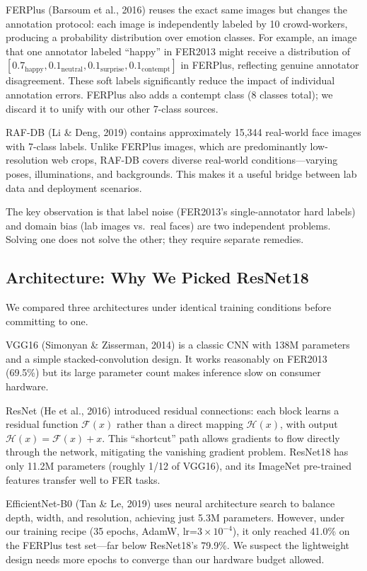 \documentclass[12pt,a4paper]{article}
\begin{document}
FERPlus (Barsoum et al., 2016) reuses the exact same images but changes the annotation protocol: each image is independently labeled by 10 crowd-workers, producing a probability distribution over emotion classes. For example, an image that one annotator labeled ``happy'' in FER2013 might receive a distribution of $[0.7_{\text{happy}}, 0.1_{\text{neutral}}, 0.1_{\text{surprise}}, 0.1_{\text{contempt}}]$ in FERPlus, reflecting genuine annotator disagreement. These soft labels significantly reduce the impact of individual annotation errors. FERPlus also adds a contempt class (8 classes total); we discard it to unify with our other 7-class sources.

RAF-DB (Li \& Deng, 2019) contains approximately 15,344 real-world face images with 7-class labels. Unlike FERPlus images, which are predominantly low-resolution web crops, RAF-DB covers diverse real-world conditions---varying poses, illuminations, and backgrounds. This makes it a useful bridge between lab data and deployment scenarios.

The key observation is that label noise (FER2013's single-annotator hard labels) and domain bias (lab images vs.\ real faces) are two independent problems. Solving one does not solve the other; they require separate remedies.

\subsection{Architecture: Why We Picked ResNet18}

We compared three architectures under identical training conditions before committing to one.

VGG16 (Simonyan \& Zisserman, 2014) is a classic CNN with 138M parameters and a simple stacked-convolution design. It works reasonably on FER2013 (69.5\%) but its large parameter count makes inference slow on consumer hardware.

ResNet (He et al., 2016) introduced residual connections: each block learns a residual function $\mathcal{F}(x)$ rather than a direct mapping $\mathcal{H}(x)$, with output $\mathcal{H}(x) = \mathcal{F}(x) + x$. This ``shortcut'' path allows gradients to flow directly through the network, mitigating the vanishing gradient problem. ResNet18 has only 11.2M parameters (roughly 1/12 of VGG16), and its ImageNet pre-trained features transfer well to FER tasks.

EfficientNet-B0 (Tan \& Le, 2019) uses neural architecture search to balance depth, width, and resolution, achieving just 5.3M parameters. However, under our training recipe (35 epochs, AdamW, lr=$3\times10^{-4}$), it only reached 41.0\% on the FERPlus test set---far below ResNet18's 79.9\%. We suspect the lightweight design needs more epochs to converge than our hardware budget allowed.
\end{document}

